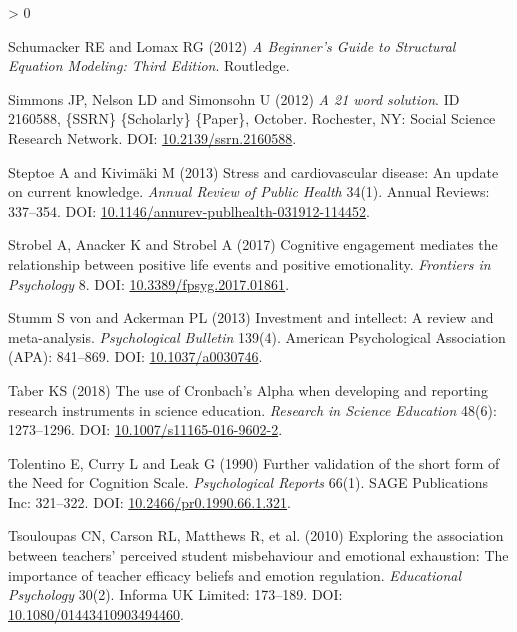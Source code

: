 \documentclass[
  english,
  man,floatsintext]{apa6}
\newlength{\cslhangindent}
\newenvironment{CSLReferences}[2] %
 {%
  \setlength{\parindent}{0pt}
  \ifodd #1 \everypar{\setlength{\hangindent}{\cslhangindent}}\ignorespaces\fi
  \ifnum #2 > 0
  \setlength{\parskip}{#2\baselineskip}
  \fi
 }%
 {}
\begin{document}
\begin{CSLReferences}{1}{0}
\leavevmode\hypertarget{ref-Schumacker2012}{}%
Schumacker RE and Lomax RG (2012) \emph{A {Beginner}'s {Guide} to {Structural} {Equation} {Modeling}: {Third} {Edition}}. Routledge.

\leavevmode\hypertarget{ref-Simmons2012}{}%
Simmons JP, Nelson LD and Simonsohn U (2012) \emph{A 21 word solution}. ID 2160588, \{SSRN\} \{Scholarly\} \{Paper\}, October. Rochester, NY: Social Science Research Network. DOI: \href{https://doi.org/10.2139/ssrn.2160588}{10.2139/ssrn.2160588}.

\leavevmode\hypertarget{ref-Steptoe2013}{}%
Steptoe A and Kivimäki M (2013) Stress and cardiovascular disease: An update on current knowledge. \emph{Annual Review of Public Health} 34(1). Annual Reviews: 337--354. DOI: \href{https://doi.org/10.1146/annurev-publhealth-031912-114452}{10.1146/annurev-publhealth-031912-114452}.

\leavevmode\hypertarget{ref-Strobel2017}{}%
Strobel A, Anacker K and Strobel A (2017) Cognitive engagement mediates the relationship between positive life events and positive emotionality. \emph{Frontiers in Psychology} 8. DOI: \href{https://doi.org/10.3389/fpsyg.2017.01861}{10.3389/fpsyg.2017.01861}.

\leavevmode\hypertarget{ref-Stumm2013}{}%
Stumm S von and Ackerman PL (2013) Investment and intellect: A review and meta-analysis. \emph{Psychological Bulletin} 139(4). American Psychological Association ({APA}): 841--869. DOI: \href{https://doi.org/10.1037/a0030746}{10.1037/a0030746}.

\leavevmode\hypertarget{ref-Taber2018}{}%
Taber KS (2018) The use of {Cronbach}'s {Alpha} when developing and reporting research instruments in science education. \emph{Research in Science Education} 48(6): 1273--1296. DOI: \href{https://doi.org/10.1007/s11165-016-9602-2}{10.1007/s11165-016-9602-2}.

\leavevmode\hypertarget{ref-Tolentino1990}{}%
Tolentino E, Curry L and Leak G (1990) Further validation of the short form of the {Need} for {Cognition} {Scale}. \emph{Psychological Reports} 66(1). SAGE Publications Inc: 321--322. DOI: \href{https://doi.org/10.2466/pr0.1990.66.1.321}{10.2466/pr0.1990.66.1.321}.

\leavevmode\hypertarget{ref-Tsouloupas2010}{}%
Tsouloupas CN, Carson RL, Matthews R, et al. (2010) Exploring the association between teachers' perceived student misbehaviour and emotional exhaustion: The importance of teacher efficacy beliefs and emotion regulation. \emph{Educational Psychology} 30(2). Informa {UK} Limited: 173--189. DOI: \href{https://doi.org/10.1080/01443410903494460}{10.1080/01443410903494460}.


\end{CSLReferences}
\end{document}
